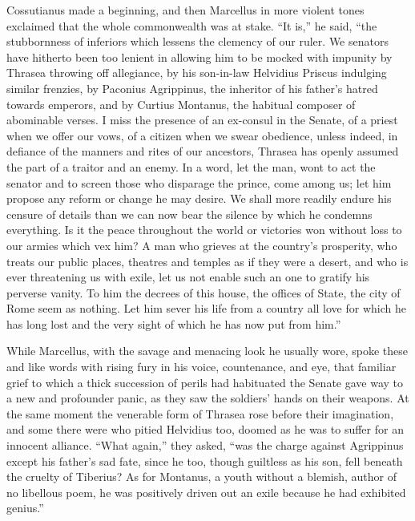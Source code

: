 
Cossutianus made a beginning, and then Marcellus in more violent tones exclaimed that the whole commonwealth was at stake. ``It is,'' he said, ``the stubbornness of inferiors which lessens the clemency of our ruler. We senators have hitherto been too lenient in allowing him to be mocked with impunity by Thrasea throwing off allegiance, by his son-in-law Helvidius Priscus indulging similar frenzies, by Paconius Agrippinus, the inheritor of his father's hatred towards emperors, and by Curtius Montanus, the habitual composer of abominable verses. I miss the presence of an ex-consul in the Senate, of a priest when we offer our vows, of a citizen when we swear obedience, unless indeed, in defiance of the manners and rites of our ancestors, Thrasea has openly assumed the part of a traitor and an enemy. In a word, let the man, wont to act the senator and to screen those who disparage the prince, come among us; let him propose any reform or change he may desire. We shall more readily endure his censure of details than we can now bear the silence by which he condemns everything. Is it the peace throughout the world or victories won without loss to our armies which vex him? A man who grieves at the country's prosperity, who treats our public places, theatres and temples as if they were a desert, and who is ever threatening us with exile, let us not enable such an one to gratify his perverse vanity. To him the decrees of this house, the offices of State, the city of Rome seem as nothing. Let him sever his life from a country all love for which he has long lost and the very sight of which he has now put from him.''


While Marcellus, with the savage and menacing look he usually wore, spoke these and like words with rising fury in his voice, countenance, and eye, that familiar grief to which a thick succession of perils had habituated the Senate gave way to a new and profounder panic, as they saw the soldiers' hands on their weapons. At the same moment the venerable form of Thrasea rose before their imagination, and some there were who pitied Helvidius too, doomed as he was to suffer for an innocent alliance. ``What again,'' they asked, ``was the charge against Agrippinus except his father's sad fate, since he too, though guiltless as his son, fell beneath the cruelty of Tiberius? As for Montanus, a youth without a blemish, author of no libellous poem, he was positively driven out an exile because he had exhibited genius.''

